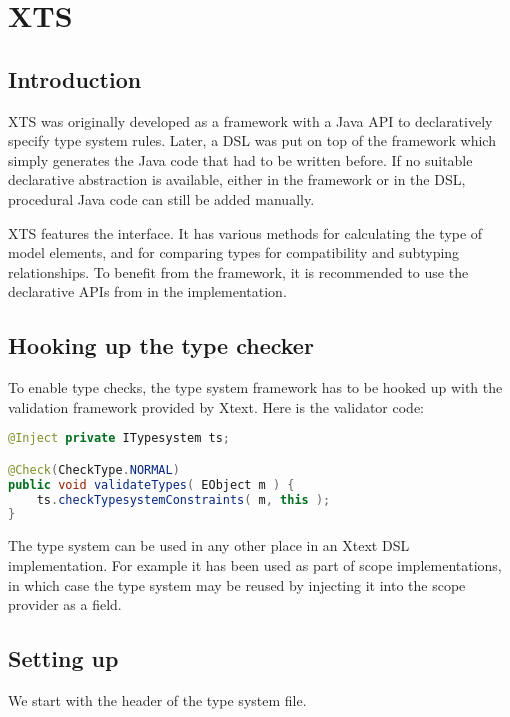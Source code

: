 \section{XTS}
\label{sec:xts}

\subsection{Introduction}

XTS was originally developed as a framework with a Java API to declaratively
specify type system rules. Later, a DSL was put on top of the framework which
simply generates the Java code that had to be written before.
If no suitable declarative abstraction is available, either in the framework or
in the DSL, procedural Java code can still be added manually.

XTS features the  interface. It has various methods for
calculating the type of model elements, and for comparing types for
compatibility and subtyping relationships. To benefit from the framework, it is
recommended to use the declarative APIs from in the 
implementation.

\subsection{Hooking up the type checker}

To enable type checks, the type system framework  has to be hooked up with the
validation  framework provided by Xtext. Here is the validator code:

\begin{lstlisting}[language=Java] 
@Inject private ITypesystem ts;

@Check(CheckType.NORMAL)
public void validateTypes( EObject m ) {
    ts.checkTypesystemConstraints( m, this );
}    
\end{lstlisting}

The type system can be used in any other place in an Xtext DSL implementation.
For example it has been used as part of scope implementations, in which case the
type system may be reused by injecting it into the scope provider as a field.

\subsection{Setting up}

We start with the header of the type system file.


